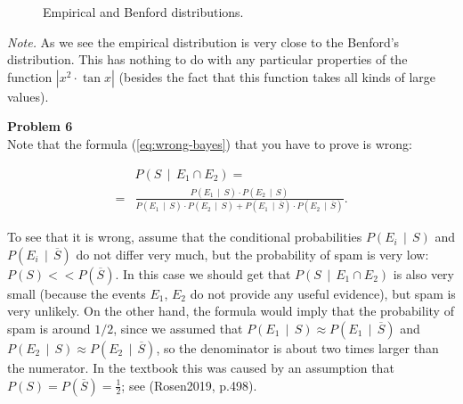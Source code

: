 \documentclass[jou]{apa6}
\begin{document}
\begin{figure}[!htb]
\caption{\label{fig:benford} Empirical and Benford distributions.}
\end{figure}

{\em Note.} As we see the empirical distribution is very close
to the Benford's distribution. This has nothing to do with 
any particular properties of the function $|x^2 \cdot \tan x|$
(besides the fact that this function takes all kinds of large values). 



\vspace{10pt}
{\bf Problem 6}\\
Note that the formula (\ref{eq:wrong-bayes}) that you have to prove is wrong:

\begin{align}
 & P\left( S \,\mid\, E_1 \cap E_2 \right) = \nonumber \\
= & \frac{P(E_1 \,\mid\, S) \cdot P(E_2 \,\mid\, S)}{P(E_1 \,\mid\, S) \cdot P(E_2 \,\mid\, S)
+ P(E_1 \,\mid\, \overline{S} ) \cdot P(E_2 \,\mid\, \overline{S} )}. \label{eq:wrong-bayes}
\end{align}


To see that it is wrong, assume that the conditional probabilities $P(E_i \,\mid\, S)$
and $P(E_i \,\mid\, \overline{S})$ do not differ very much, but the probability of spam is very low: 
$P(S) << P(\overline{S})$. In this case we should get that $P\left( S \,\mid\, E_1 \cap E_2 \right)$ 
is also very small (because the events $E_1$, $E_2$ do not provide any useful evidence), but
spam is very unlikely. On the other hand, the formula would imply that the probability of spam is around $1/2$, 
since we assumed that $P(E_1 \,\mid\, S) \approx P(E_1 \,\mid\, \overline{S})$
and $P(E_2 \,\mid\, S) \approx P(E_2 \,\mid\, \overline{S})$, so the denominator is about two times larger
than the numerator. In the textbook this was caused by an assumption that 
$P(S) = P(\overline{S}) = \frac{1}{2}$; see (Rosen2019, p.498). 
\end{document}
